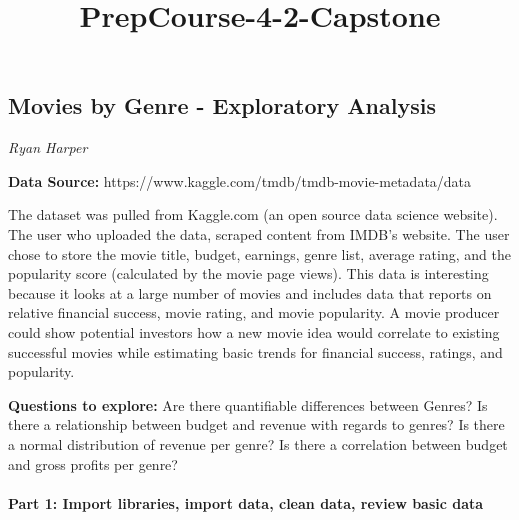 \documentclass[11pt]{article}
\title{PrepCourse-4-2-Capstone}
\begin{document}
    
    
    \maketitle
    
    

    
    \subsection{Movies by Genre - Exploratory
Analysis}\label{movies-by-genre---exploratory-analysis}

    \emph{Ryan Harper}

    \textbf{Data Source:}
https://www.kaggle.com/tmdb/tmdb-movie-metadata/data

    The dataset was pulled from Kaggle.com (an open source data science
website). The user who uploaded the data, scraped content from IMDB's
website. The user chose to store the movie title, budget, earnings,
genre list, average rating, and the popularity score (calculated by the
movie page views). This data is interesting because it looks at a large
number of movies and includes data that reports on relative financial
success, movie rating, and movie popularity. A movie producer could show
potential investors how a new movie idea would correlate to existing
successful movies while estimating basic trends for financial success,
ratings, and popularity.

    \textbf{Questions to explore:} Are there quantifiable differences
between Genres? Is there a relationship between budget and revenue with
regards to genres? Is there a normal distribution of revenue per genre?
Is there a correlation between budget and gross profits per genre?

    

    \paragraph{Part 1: Import libraries, import data, clean data, review
basic
data}\label{part-1-import-libraries-import-data-clean-data-review-basic-data}
\end{document}
